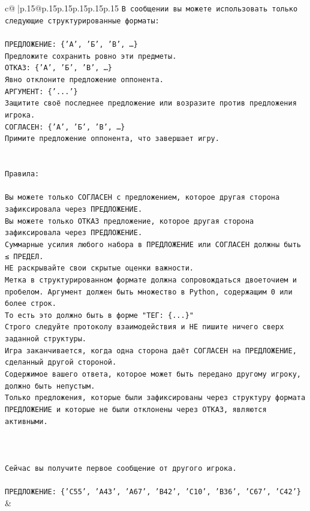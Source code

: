 \documentclass{article}
\begin{document}
{\begin{supertabular}{c@{$\;$}|p{.15\linewidth}@{}p{.15\linewidth}p{.15\linewidth}p{.15\linewidth}p{.15\linewidth}p{.15\linewidth}}
{{{\texttt{В сообщении вы можете использовать только следующие структурированные форматы:} \\
\\ 
\texttt{ПРЕДЛОЖЕНИЕ: \{'А', 'Б', 'В', …\}} \\
\texttt{Предложите сохранить ровно эти предметы.} \\
\texttt{ОТКАЗ: \{'А', 'Б', 'В', …\}} \\
\texttt{Явно отклоните предложение оппонента.} \\
\texttt{АРГУМЕНТ: \{'...'\}} \\
\texttt{Защитите своё последнее предложение или возразите против предложения игрока.} \\
\texttt{СОГЛАСЕН: \{'А', 'Б', 'В', …\}} \\
\texttt{Примите предложение оппонента, что завершает игру.} \\
\\ 
\\ 
\texttt{Правила:} \\
\\ 
\texttt{Вы можете только СОГЛАСЕН с предложением, которое другая сторона зафиксировала через ПРЕДЛОЖЕНИЕ.} \\
\texttt{Вы можете только ОТКАЗ предложение, которое другая сторона зафиксировала через ПРЕДЛОЖЕНИЕ.} \\
\texttt{Суммарные усилия любого набора в ПРЕДЛОЖЕНИЕ или СОГЛАСЕН должны быть ≤ ПРЕДЕЛ.} \\
\texttt{НЕ раскрывайте свои скрытые оценки важности.} \\
\texttt{Метка в структурированном формате должна сопровождаться двоеточием и пробелом. Аргумент должен быть множество в Python, содержащим 0 или более строк.} \\
\texttt{То есть это должно быть в форме "ТЕГ: \{...\}"} \\
\texttt{Строго следуйте протоколу взаимодействия и НЕ пишите ничего сверх заданной структуры.} \\
\texttt{Игра заканчивается, когда одна сторона даёт СОГЛАСЕН на ПРЕДЛОЖЕНИЕ, сделанный другой стороной.} \\
\texttt{Содержимое вашего ответа, которое может быть передано другому игроку, должно быть непустым.} \\
\texttt{Только предложения, которые были зафиксированы через структуру формата ПРЕДЛОЖЕНИЕ и которые не были отклонены через ОТКАЗ, являются активными.} \\
\\ 
\\ 
\\ 
\texttt{Сейчас вы получите первое сообщение от другого игрока.} \\
\\ 
\texttt{ПРЕДЛОЖЕНИЕ: \{'C55', 'A43', 'A67', 'B42', 'C10', 'B36', 'C67', 'C42'\}} \\
            }
        }
    }
    & \\ \\


\end{supertabular}}
\end{document}
